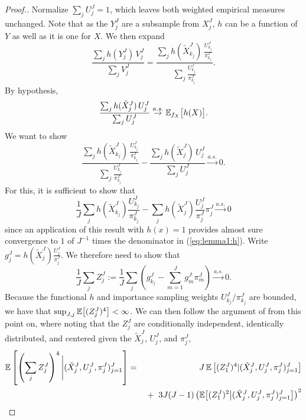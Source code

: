 \begin{proof}[Proof.]
    Normalize $\sum_j U_j^J=1$, which leaves both weighted empirical measures unchanged.
    Note that as the $Y_j^J$ are a subsample from $X_j^J$, $h$ can be a function of $Y$ as well as it is one for $X$. We then expand
    \begin{equation}\frac{\sum_j h(Y_j^J) \, V_j^J}{\sum_j V_j^J} = \frac{\sum_j h(\tilde X_{k_j}^J)\, \frac{U_{k_j}^J}{\pi_{k_j}^J}}{\sum_j \frac{U_{k_j}^J}{\pi_{k_j}^J}}.\end{equation}
    By hypothesis,
    \begin{equation}
    \frac{\sum_j h(\tilde X_j^J)\, U_j^J}{\sum_j U_j^J} \stackrel{a.s.}{\to} \mathbb{E}_{f_X}\big[h(X)\big].
    \end{equation}
    We want to show
    \begin{equation}\label{eq:lemma1:h}
    \frac{\sum_j h(\tilde X_{k_j}^J)\, \frac{U_{k_j}^J}{\pi_{k_j}^J}}{\sum_j \frac{U_{k_j}^J}{\pi_{k_j}^J}} - \frac{\sum_j h(\tilde X_j^J)\, U_j^J}{\sum_j U_j^J} \stackrel{a.s.}{\to} 0.
    \end{equation}
    For this, it is sufficient to show that
   \begin{equation} 
   \frac1J\sum_j h(\tilde X_{k_j}^J)\frac{U_{k_j}^J}{\pi_{k_j}^J}
    -  \sum_j h(\tilde X_j^J)\frac{U_j^J}{\pi_j^J}\pi_j^J \stackrel{a.s.}{\to} 0 
    \end{equation}
    since an application of this result with $h(x)=1$ provides almost sure convergence to $1$ of $J^{-1}$ times the denominator in (\ref{eq:lemma1:h}).
    Write $g_j^J = h(\tilde X_j^J)\frac{U_{j}^J}{\pi_{j}^J}$. We therefore need to show that
    \begin{equation}
    \frac1J\sum_j Z_j^J := \frac1J\sum_j \left(g_{k_j}^J - \sum_{m=1}^J g_m^J\pi_m^J \right) \stackrel{a.s.}{\to} 0.
\end{equation}
    Because the functional $h$ and importance sampling weights $U_{k_j}^J/\pi_{k_j}^J$ are bounded, we have that $\sup_{J,j}\mathbb{E}\big[(Z_j^J)^4\big] < \infty$. We can then follow the argument of \cite{chopin20} from this point on, where noting that the $Z_j^J$ are conditionally independent, identically distributed, and centered given the $\tilde{X}_j^J$, $U_j^J$, and $\pi_j^J$,
    \begin{eqnarray} 
    \E\left[\left(\sum_j Z_j^J\right)^4 \Bigg| (\tilde X_j^J,U_j^J,\pi_j^J)_{j=1}^J \right]
    &=& J\, \E\left[(Z_1^J)^4|(\tilde X_j^J,U_j^J,\pi_j^J)_{j=1}^J\right]
    \nonumber
    \\
    && \hspace{1mm}+ \hspace{2mm} 3J(J-1)\left(\E\big[(Z_{1}^J)^2\big|(\tilde X_j^J,U_j^J,\pi_j^J)_{j=1}^J\big]\right)^{2}

\end{eqnarray}
\end{proof}
